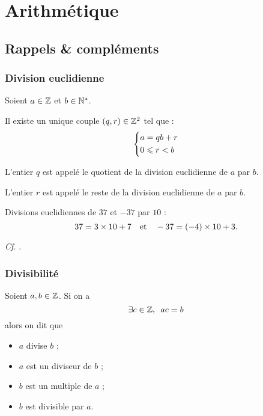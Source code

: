 \chapter{Arithmétique}

\minitoc

\section{Rappels \& compléments}

\subsection{Division euclidienne}

\begin{defprop}
Soient \(a\in\Z\) et \(b\in\Ns\).

Il existe un unique couple \(\paren{q,r}\in\Z^2\) tel que : \[\begin{dcases}a=qb+r \\ 0\leq r<b\end{dcases}\]

L'entier \(q\) est appelé le quotient de la division euclidienne de \(a\) par \(b\).

L'entier \(r\) est appelé le reste de la division euclidienne de \(a\) par \(b\).
\end{defprop}

\begin{ex}
Divisions euclidiennes de \(37\) et \(-37\) par \(10\) : \[37=3\times10+7\quad\text{et}\quad-37=\paren{-4}\times10+3.\]
\end{ex}

\begin{dem}
\textit{Cf.} .
\end{dem}

\subsection{Divisibilité}

\begin{defi}
Soient \(a,b\in\Z\). Si on a \[\quantifs{\exists c\in\Z}ac=b\] alors on dit que \begin{itemize}
\item \(a\) divise \(b\) ;

\item \(a\) est un diviseur de \(b\) ;

\item \(b\) est un multiple de \(a\) ;

\item \(b\) est divisible par \(a\).
\end{itemize}
\end{defi}

